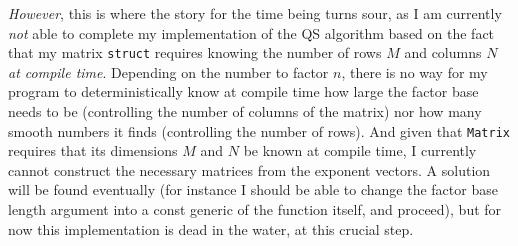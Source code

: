 \documentclass{report}
\begin{document}
\emph{However}, this is where the story for the time being turns sour, as
I am currently \emph{not} able to complete my implementation of the QS algorithm
based on the fact that my matrix \Verb+struct+ requires knowing the number of rows $M$
and columns $N$ \emph{at compile time}. Depending on the number to factor $n$,
there is no way for my program to deterministically know at compile time how
large the factor base needs to be (controlling the number of columns of the
matrix) nor how many smooth numbers it finds (controlling the number of rows).
And given that \Verb+Matrix+ requires that its dimensions $M$ and $N$ be known
at compile time, I currently cannot construct the necessary matrices from the
exponent vectors. A solution will be found eventually (for instance I should be
able to change the factor base length argument into a const generic of the
function itself, and proceed), but for now this implementation is dead in the
water, at this crucial step.
\end{document}
